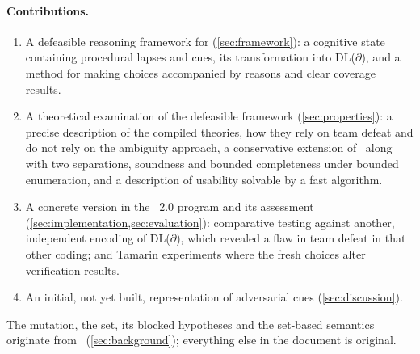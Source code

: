 \paragraph{Contributions.}
\begin{enumerate}
\item A defeasible reasoning framework for \forget{} (\cref{sec:framework}): a cognitive state containing procedural lapses and cues, its transformation into DL($\partial$), and a method for making choices accompanied by reasons and clear coverage results.
\item A theoretical examination of the defeasible framework (\cref{sec:properties}): a precise description of the compiled theories, how they rely on team defeat and do not rely on the ambiguity approach, a conservative extension of~\SCP{} along with two separations, soundness and bounded completeness under bounded enumeration, and a description of usability solvable by a fast algorithm.
\item A concrete version in the \XMen~2.0 program and its assessment (\cref{sec:implementation,sec:evaluation}): comparative testing against another, independent encoding of DL($\partial$), which revealed a flaw in team defeat in that other coding; and Tamarin experiments where the fresh choices alter verification results.
\item An initial, not yet built, representation of adversarial cues (\cref{sec:discussion}).
\end{enumerate}
The \forget{} mutation, the \Forget{} set, its blocked hypotheses and the set-based semantics originate from~\SCP{} (\cref{sec:background}); everything else in the document is original.
